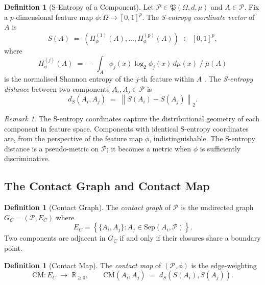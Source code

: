 \documentclass[12pt,a4paper,twocolumn]{article}
\theoremstyle{plain}
\theoremstyle{definition}
\newtheorem{definition}[theorem]{Definition}
\theoremstyle{remark}
\newtheorem{remark}[theorem]{Remark}
\newcommand{\Part}{\mathcal{P}}
\newcommand{\Sep}{\mathrm{Sep}}
\newcommand{\CM}{\mathrm{CM}}
\newcommand{\Scoord}{S}
\newcommand{\dS}{d_S}
\newcommand{\GC}{G_C}
\newcommand{\Real}{\mathbb{R}}
\begin{document}
\begin{definition}[S-Entropy of a Component]
\label{def:s-entropy}
Let $\Part \in \mathfrak{P}(\Omega,d,\mu)$ and $A \in \Part$.  Fix a
$p$-dimensional feature map $\phi : \Omega \to [0,1]^p$.  The
\emph{S-entropy coordinate vector} of $A$ is
\begin{equation}
  \Scoord(A) \;=\; \left( H_\phi^{(1)}(A), \ldots, H_\phi^{(p)}(A) \right)
    \;\in\; [0,1]^p,
\end{equation}
where
\begin{equation}
  H_\phi^{(j)}(A) \;=\; -\int_A \phi_j(x) \log_2 \phi_j(x)\, d\mu(x)
    \;\bigg/\; \mu(A)
\end{equation}
is the normalised Shannon entropy of the $j$-th feature within $A$
\citep{shannon1948mathematical, cover2006elements}.  The \emph{S-entropy
distance} between two components $A_i, A_j \in \Part$ is
\begin{equation}
  \dS(A_i, A_j) \;=\; \left\|\Scoord(A_i) - \Scoord(A_j)\right\|_2.
\end{equation}
\end{definition}

\begin{remark}
The S-entropy coordinates capture the distributional geometry of each
component in feature space.  Components with identical S-entropy coordinates
are, from the perspective of the feature map $\phi$, indistinguishable.
The S-entropy distance is a pseudo-metric on $\Part$; it becomes a metric
when $\phi$ is sufficiently discriminative.
\end{remark}

\subsection{The Contact Graph and Contact Map}

\begin{definition}[Contact Graph]
\label{def:contact-graph}
The \emph{contact graph} of $\Part$ is the undirected graph
$\GC = (\Part, E_C)$ where
\begin{equation}
  E_C = \left\{\{A_i, A_j\} : A_j \in \Sep(A_i, \Part)\right\}.
\end{equation}
Two components are adjacent in $\GC$ if and only if their closures share a
boundary point.
\end{definition}

\begin{definition}[Contact Map]
\label{def:contact-map}
The \emph{contact map} of $(\Part, \phi)$ is the edge-weighting
\begin{equation}
  \CM : E_C \;\longrightarrow\; \Real_{\geq 0}, \qquad
  \CM(A_i, A_j) \;=\; \dS(S(A_i), S(A_j)).
\end{equation}
\end{definition}
\end{document}

